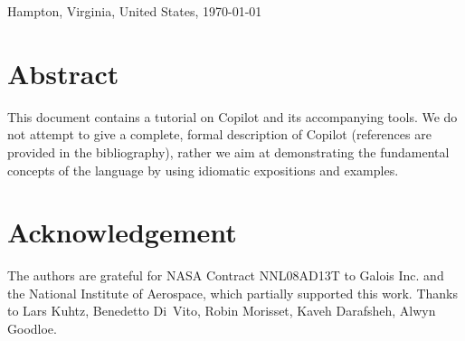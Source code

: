 \documentclass[12pt]{article}
\theoremstyle{example}
\begin{document}
\begin{center}
\vspace{1cm}

{\large
Hampton, Virginia, United States, \today
}


\let\thefootnote\relax{}

\end{center}

\vspace{0.25cm}

\section*{Abstract}

{
\small
This document contains a tutorial on Copilot and its accompanying tools.
We do not attempt to give a complete, formal description of Copilot
(references are provided in the bibliography), rather we aim at
demonstrating the fundamental concepts of the language by using idiomatic
expositions and examples.
}

{
\small
\setcounter{tocdepth}{2}
\tableofcontents
}

\newpage
{}
\section*{Acknowledgement}

The authors are grateful for NASA Contract NNL08AD13T to Galois Inc. and the
National Institute of Aerospace, which partially supported this work.
Thanks to Lars Kuhtz, Benedetto Di~Vito,  Robin Morisset, Kaveh
Darafsheh, Alwyn Goodloe.  

{






 
 
 
 


}

\begin{appendices}


\end{appendices}
\end{document}
